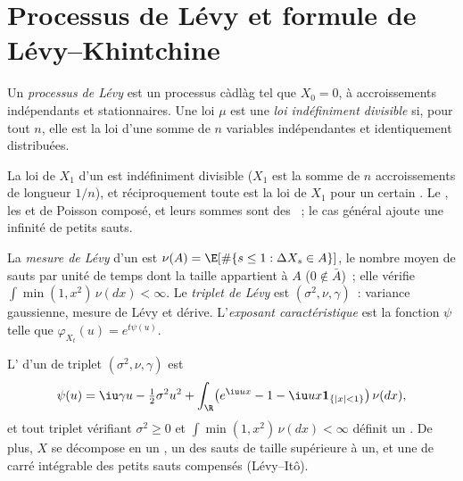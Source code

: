 \section{Processus de Lévy et formule de Lévy--Khintchine}

\begin{definition}\label{def:qm:jump-processes:levy}
Un \emph{processus de Lévy} est un processus càdlàg tel que $X_0 = 0$, à accroissements indépendants et
stationnaires. Une loi $\mu$ est une \emph{loi indéfiniment divisible}
si, pour tout $n$, elle est la loi d'une somme de $n$ variables indépendantes et identiquement
distribuées.
\end{definition}

La loi de $X_1$ d'un  est indéfiniment divisible ($X_1$ est la somme de $n$ accroissements de longueur
$1/n$), et réciproquement toute  est la loi de $X_1$ pour un certain . Le
, les  et de Poisson composé, et leurs sommes sont des ~; le
cas général ajoute une infinité de petits sauts.

\begin{definition}\label{def:qm:jump-processes:triplet}
La \emph{mesure de Lévy} d'un  est $\nu(A) = \E[\#\{s \le 1 : \Delta X_s \in A\}]$,
le nombre moyen de sauts par unité de temps dont la taille appartient à $A$ ($0 \notin \bar A$)~; elle vérifie
$\int\min(1, x^2)\,\nu(dx) < \infty$. Le \emph{triplet de Lévy} est $(\sigma^2, \nu, \gamma)$~:
variance gaussienne, mesure de Lévy et dérive. L'\emph{exposant caractéristique}
est la fonction $\psi$ telle que $\varphi_{X_t}(u) = e^{t\psi(u)}$.
\end{definition}

\begin{theorem}\label{thm:qm:jump-processes:lk}
L' d'un  de triplet $(\sigma^2, \nu, \gamma)$ est
\[
\psi(u) = \iu\gamma u - \tfrac12\sigma^2u^2 + \int_{\R}\bigl(e^{\iu ux} - 1 - \iu ux\mathbf 1_{\{|x|<1\}}\bigr)\,\nu(dx),
\]
et tout triplet vérifiant $\sigma^2 \ge 0$ et $\int\min(1, x^2)\,\nu(dx) < \infty$ définit un .
De plus, $X$ se décompose en un , un  des sauts
de taille supérieure à un, et une  de carré intégrable des petits sauts compensés (Lévy--Itô).
\end{theorem}

